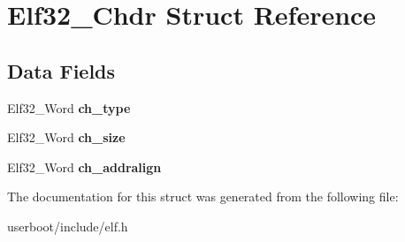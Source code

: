 \hypertarget{structElf32__Chdr}{}\section{Elf32\+\_\+\+Chdr Struct Reference}
\label{structElf32__Chdr}
\subsection*{Data Fields}
\begin{DoxyCompactItemize}
\item 
Elf32\+\_\+\+Word {\bfseries ch\+\_\+type}\hypertarget{structElf32__Chdr_a7b78dd3e0ba865cd44c8a4f705d19954}{}\label{structElf32__Chdr_a7b78dd3e0ba865cd44c8a4f705d19954}

\item 
Elf32\+\_\+\+Word {\bfseries ch\+\_\+size}\hypertarget{structElf32__Chdr_afbf67385dafc8d3a35034b9c5a755d6b}{}\label{structElf32__Chdr_afbf67385dafc8d3a35034b9c5a755d6b}

\item 
Elf32\+\_\+\+Word {\bfseries ch\+\_\+addralign}\hypertarget{structElf32__Chdr_a72370f6928a556d16dd0fcfae9978c60}{}\label{structElf32__Chdr_a72370f6928a556d16dd0fcfae9978c60}

\end{DoxyCompactItemize}


The documentation for this struct was generated from the following file\+:\begin{DoxyCompactItemize}
\item 
userboot/include/elf.\+h\end{DoxyCompactItemize}
